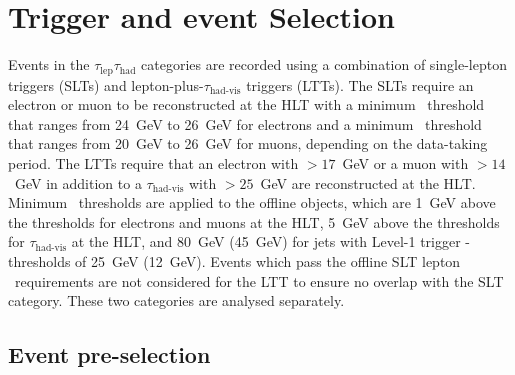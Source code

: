 \section{Trigger and event Selection}



\label{sec:DiHiggs:selection}



Events in the $\tau_\text{lep}\tau_\text{had}$ categories 
are recorded using a combination of single-lepton triggers (SLTs) 
and lepton-plus-$\tau_\text{had-vis}$ triggers (LTTs). 
The SLTs require an electron or muon to be reconstructed 
at the HLT with a minimum \pt\ threshold that 
ranges from 24~GeV to 26~GeV for electrons and 
a minimum \pt\ threshold that 
ranges from 20~GeV to 26~GeV for muons, 
depending on the data-taking period. 
The LTTs require that an electron with \pt $>17$~GeV 
or a muon with \pt$>14$~GeV in addition to 
a $\tau_\text{had-vis}$ with \pt$>25$~GeV are reconstructed at the HLT. 
Minimum \pt\ thresholds are applied to the offline objects, 
which are 1~GeV above the thresholds for electrons and muons at the HLT, 
5~GeV above the thresholds for $\tau_\text{had-vis}$ at the HLT, 
and 80~GeV (45~GeV) for jets with 
Level-1 trigger \pt-thresholds of 25~GeV (12~GeV). 
Events which pass the offline SLT lepton \pt\ requirements 
are not considered for the LTT to ensure no overlap with the SLT category. 
These two categories are analysed separately.




\subsection{Event pre-selection}

\label{sec:DiHiggs:selection}



